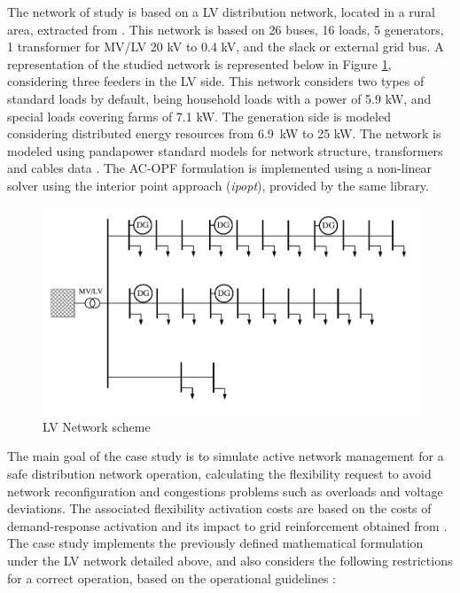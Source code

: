 The network of study is based on a LV distribution network, located in a rural area, extracted from \cite{Linder2014}. This network is based on 26 buses, 16 loads, 5 generators, 1 transformer for MV/LV 20 kV to 0.4 kV, and the slack or external grid bus. A representation of the studied network is represented below in Figure \ref{fig:case_study_LV}, considering three feeders in the LV side. 
This network considers two types of standard loads by default, being household loads with a power of 5.9 kW, and special loads covering farms of 7.1 kW. The generation side is modeled considering distributed energy resources from 6.9~kW to 25 kW. The network is modeled using pandapower standard models for network structure, transformers and cables data \cite{Thurner_2018}. The AC-OPF formulation is implemented using a non-linear solver using the interior point approach (\textit{ipopt}), provided by the same library. 
\vspace{10mm}
\begin{figure}[htbp]
	\centering
	\includegraphics[width=1\columnwidth ]{ChapterOPF_DSO/Figures/LV_network_2.pdf}
		\caption{LV Network scheme}
	\label{fig:case_study_LV}  
\end{figure}

The main goal of the case study is to simulate active network management for a safe distribution network operation, calculating the flexibility request to avoid network reconfiguration and congestions problems such as overloads and voltage deviations. The associated flexibility activation costs are based on the costs of demand-response activation and its impact to grid reinforcement obtained from \cite{EUCommision-DGEnergy2016, Saygn2019}. The case study implements the previously defined mathematical formulation under the LV network detailed above, and also considers the following restrictions for a correct operation, based on the operational guidelines \cite{BAYER2020336, Giannelos2016}: 

